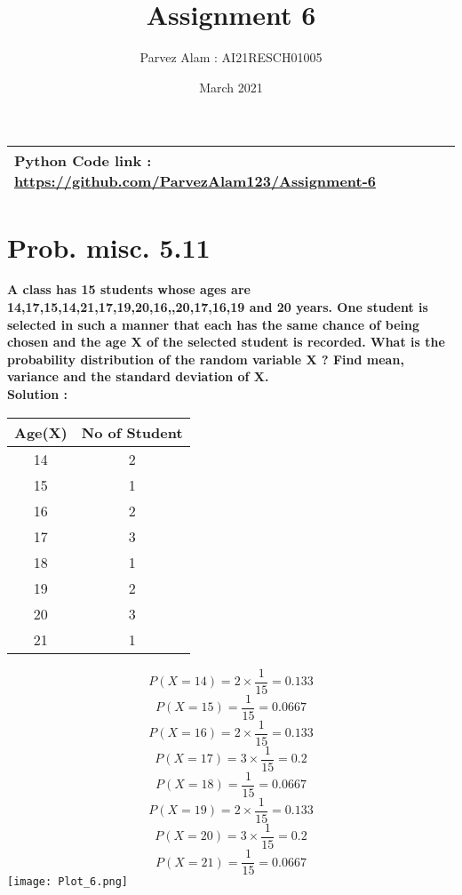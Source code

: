 \documentclass{article}
\title{Assignment 6}
\author{Parvez Alam : AI21RESCH01005 }
\date{March 2021}
\begin{document}
\maketitle
\begin{multicols}{2}
\begin{center}
    \begin{tabular}{|p{5cm}|}
         \hline
         Python Code link :
         \url{https://github.com/ParvezAlam123/Assignment-6} \\
         \hline
          
    \end{tabular}
\end{center}

\section{Prob. misc. 5.11}
\textbf{A class has 15 students whose ages are 14,17,15,14,21,17,19,20,16,,20,17,16,19 and 20 years. One student is selected in such a manner that each has the same chance of being chosen and the age X of the selected student is recorded. What is the probability distribution of the random variable X ? Find mean, variance and the standard deviation of X.} \\ 
\textbf{Solution :} 
\begin{center}
    \begin{tabular}{|c|c|}
       \hline
         Age(X) & No of Student  \\
         \hline
       14  & 2 \\
       \hline
       15 & 1  \\
       \hline
       16 & 2  \\
       \hline
       17 & 3 \\
       \hline
       18 & 1 \\
       \hline
       19 & 2  \\
       \hline
       20 & 3   \\
       \hline
       21 & 1  \\
       \hline
    \end{tabular}
\end{center}
\[P(X=14) = 2\times \frac{1}{15}= 0.133\] 
\[P(X=15)= \frac{1}{15} = 0.0667\] 
\[P(X=16)= 2\times \frac{1}{15} =0.133 \]  
\[P(X=17)= 3\times \frac{1}{15}=0.2\]
\[P(X=18)=\frac{1}{15}=0.0667\]
\[P(X=19)=2\times \frac{1}{15}=0.133\]
\[P(X=20)=3\times \frac{1}{15}=0.2\]
\[P(X=21)=\frac{1}{15}=0.0667\] 
\texttt{[image: Plot\_6.png]}

\end{multicols}
\end{document}
